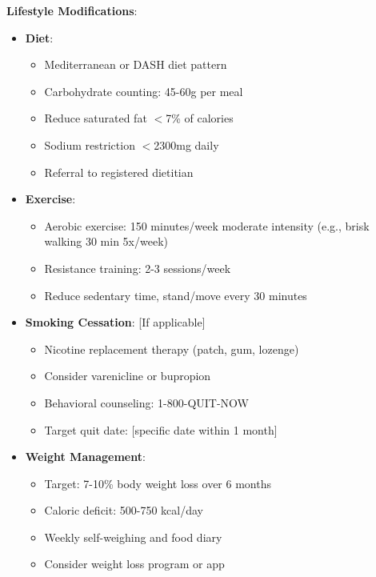 \documentclass[11pt,letterpaper]{article}
\begin{document}
\textbf{Lifestyle Modifications}:
\begin{itemize}[leftmargin=*]
    \item \textbf{Diet}:
    \begin{itemize}
        \item Mediterranean or DASH diet pattern
        \item Carbohydrate counting: 45-60g per meal
        \item Reduce saturated fat $<$7\% of calories
        \item Sodium restriction $<$2300mg daily
        \item Referral to registered dietitian
    \end{itemize}
    
    \item \textbf{Exercise}:
    \begin{itemize}
        \item Aerobic exercise: 150 minutes/week moderate intensity (e.g., brisk walking 30 min 5x/week)
        \item Resistance training: 2-3 sessions/week
        \item Reduce sedentary time, stand/move every 30 minutes
    \end{itemize}
    
    \item \textbf{Smoking Cessation}: [If applicable]
    \begin{itemize}
        \item Nicotine replacement therapy (patch, gum, lozenge)
        \item Consider varenicline or bupropion
        \item Behavioral counseling: 1-800-QUIT-NOW
        \item Target quit date: [specific date within 1 month]
    \end{itemize}
    
    \item \textbf{Weight Management}:
    \begin{itemize}
        \item Target: 7-10\% body weight loss over 6 months
        \item Caloric deficit: 500-750 kcal/day
        \item Weekly self-weighing and food diary
        \item Consider weight loss program or app
    \end{itemize}
    

\end{itemize}
\end{document}
